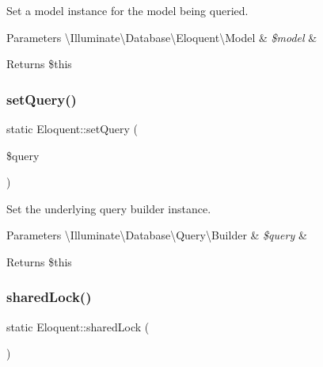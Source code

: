 Set a model instance for the model being queried.


\begin{DoxyParams}[1]{Parameters}
\textbackslash{}\+Illuminate\textbackslash{}\+Database\textbackslash{}\+Eloquent\textbackslash{}\+Model & {\em \$model} & \\
\hline
\end{DoxyParams}
\begin{DoxyReturn}{Returns}
\$this 
\end{DoxyReturn}
\mbox{\label{class_eloquent_a9f643b610f962c2ebc7a56cb6fcc0f71}} 
\subsubsection{\texorpdfstring{set\+Query()}{setQuery()}}
{\footnotesize\ttfamily static Eloquent\+::set\+Query (\begin{DoxyParamCaption}\item[{}]{\$query }\end{DoxyParamCaption})\hspace{0.3cm}{\ttfamily [static]}}

Set the underlying query builder instance.


\begin{DoxyParams}[1]{Parameters}
\textbackslash{}\+Illuminate\textbackslash{}\+Database\textbackslash{}\+Query\textbackslash{}\+Builder & {\em \$query} & \\
\hline
\end{DoxyParams}
\begin{DoxyReturn}{Returns}
\$this 
\end{DoxyReturn}
\mbox{\label{class_eloquent_a7f299b24133d1b7b5614210b34907801}} 
\subsubsection{\texorpdfstring{shared\+Lock()}{sharedLock()}}
{\footnotesize\ttfamily static Eloquent\+::shared\+Lock (\begin{DoxyParamCaption}{ }\end{DoxyParamCaption})\hspace{0.3cm}{\ttfamily [static]}}

